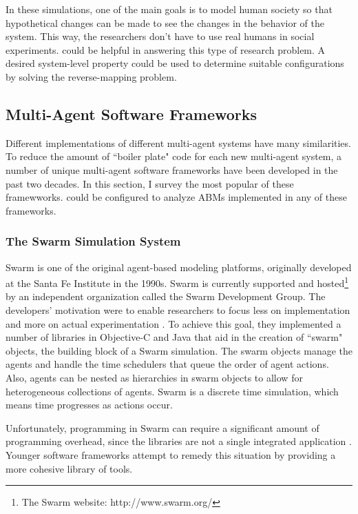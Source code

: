 In these simulations, one of the main goals is to model human society so that hypothetical changes can be made to see the changes in the behavior of the system.
This way, the researchers don't have to use real humans in social experiments.
\fw could be helpful in answering this type of research problem.
A desired system-level property could be used to determine suitable configurations by solving the reverse-mapping problem.



\subsection{Multi-Agent Software Frameworks}
Different implementations of different multi-agent systems have many similarities.
To reduce the amount of ``boiler plate" code for each new multi-agent system, a number of unique multi-agent software frameworks have been developed in the past two decades.
In this section, I survey the most popular of these framewworks.
\fw could be configured to analyze ABMs implemented in any of these frameworks.

\subsubsection{The Swarm Simulation System}
Swarm is one of the original agent-based modeling platforms, originally developed at the Santa Fe Institute in the 1990s.
Swarm is currently supported and hosted\footnote{The Swarm website: http://www.swarm.org/} by an independent organization called the Swarm Development Group.
The developers' motivation were to enable researchers to focus less on implementation and more on actual experimentation \cite{minar1996swarm}.
To achieve this goal, they implemented a number of libraries in Objective-C and Java that aid in the creation of ``swarm" objects, the building block of a Swarm simulation.
The swarm objects manage the agents and handle the time schedulers that queue the order of agent actions.
Also, agents can be nested as hierarchies in swarm objects to allow for heterogeneous collections of agents.
Swarm is a discrete time simulation, which means time progresses as actions occur.

Unfortunately, programming in Swarm can require a significant amount of programming overhead, since the libraries are not a single integrated application \cite{kleinbreve}.
Younger software frameworks attempt to remedy this situation by providing a more cohesive library of tools.


